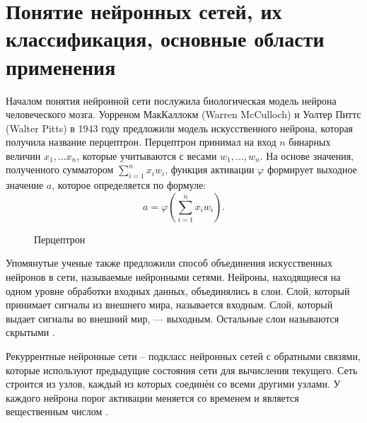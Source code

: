 \chapter{Понятие нейронных сетей, их классификация, основные области применения}
Началом понятия нейронной сети послужила биологическая модель нейрона человеческого мозга.
Уорреном МакКаллокм (Warren McCulloch) и Уолтер Питтс (Walter Pitts) в 1943 году предложили
модель искусственного нейрона, которая получила название перцептрон. Перцептрон принимал на вход $n$ бинарных величин $x_1, \dots x_n$,
которые учитываются с весами $w_1, \dots, w_n$. На основе значения, полученного сумматором $\sum_{i=1}^n x_i w_i$, функция активации
$\varphi$ формирует выходное значение $a$, которое определяется по формуле:
\begin{equation}
    a = \varphi \left( \sum\limits_{i=1}^n x_i w_i \right).
\end{equation}

\begin{figure}[H]
	\caption{Перцептрон}
\end{figure}

Упомянутые ученые также предложили способ объединения искусственных нейронов в сети, называемые нейронными сетями.
Нейроны, находящиеся на одном уровне обработки входных данных, объединялись в слои.
Слой, который принимает сигналы из внешнего мира, называется входным. Слой, который выдает сигналы во внешний мир, —
выходным. Остальные слои называются скрытыми \cite{sozykin}.

Рекуррентные нейронные сети -- подкласс нейронных сетей с обратными связями, которые
используют предыдущие состояния сети для вычисления текущего. Сеть строится из узлов, каждый
из которых соединѐн со всеми другими узлами. У каждого нейрона порог активации меняется со
временем и является вещественным числом \cite{bguir_rnn}. 

